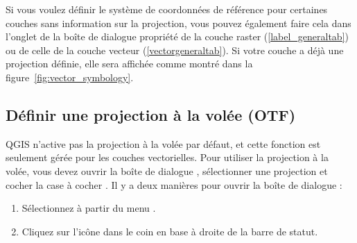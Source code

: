 Si vous voulez d\'efinir le syst\`eme de coordonn\'ees de r\'ef\'erence pour certaines
couches sans information sur la projection, vous pouvez \'egalement faire cela
dans l'onglet  de la bo\^ite de dialogue propri\'et\'e de la couche
raster (\ref{label_generaltab}) ou de celle de la couche vecteur
(\ref{vectorgeneraltab}). Si votre couche a d\'ej\`a une projection d\'efinie, elle
sera affich\'ee comme montr\'e dans la figure~\ref{fig:vector_symbology}.

\subsection{D\'efinir une projection \`a la vol\'ee (OTF)}\label{label_projstart}

QGIS n'active pas la projection \`a la vol\'ee par d\'efaut, et cette fonction est
seulement g\'er\'ee pour les couches vectorielles. Pour utiliser la projection \`a la
vol\'ee, vous devez ouvrir la bo\^ite de dialogue
, s\'electionner une
projection et cocher la case \`a cocher . Il y a deux mani\`eres pour ouvrir la bo\^ite de dialogue :

\begin{enumerate}
\item S\'electionnez  \`a partir du menu .
\item Cliquez sur l'ic\^one  dans
le coin en base \`a droite de la barre de statut.
\end{enumerate}

